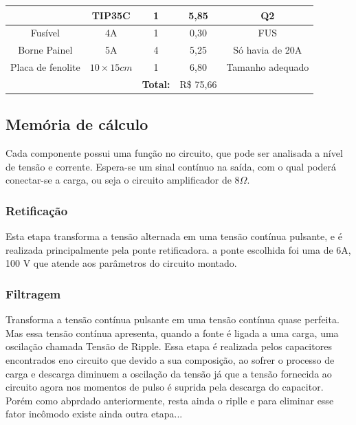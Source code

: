 \documentclass[a4paper,12pt,oneside,openany,table,xcdraw]{article}
\begin{document}
\begin{table}[H]
{\begin{tabular}{cc|c|c|c}
\multicolumn{1}{|c|}{}                              & TIP35C                 & 1                   & 5,85                         & \multicolumn{1}{c|}{Q2}                    \\ \hline
\multicolumn{1}{|c|}{Fusível}                       & 4A                     & 1                   & 0,30                         & \multicolumn{1}{c|}{FUS}                   \\ \hline
\multicolumn{1}{|c|}{Borne Painel}                  & 5A                     & 4                   & 	5,25	  & \multicolumn{1}{c|}{Só havia de 20A}       \\ \hline
\multicolumn{1}{|c|}{Placa de fenolite}             & $10\times 15cm$        & 1                   & 6,80                         & \multicolumn{1}{c|}{Tamanho adequado}      \\ \hline
                                                    &                        & \textbf{Total:}     & R\$ 75,66                    &                                            \\ \cline{3-4}
\end{tabular}%
}
\end{table}

\vspace{0.2cm}
\subsection{Memória de cálculo} %
Cada componente possui uma função no circuito, que pode ser analisada a nível de tensão e corrente. Espera-se um sinal contínuo na saída, com o qual poderá conectar-se a carga, ou seja o circuito amplificador de $8 \Omega$.

\subsubsection{Retificação}
Esta etapa transforma a tensão alternada em uma tensão contínua pulsante, e é realizada principalmente pela ponte retificadora. a ponte escolhida foi uma de 6A, 100 V que atende aos parâmetros do circuito montado.


\subsubsection{Filtragem}
Transforma a tensão contínua pulsante em uma tensão contínua quase perfeita. Mas essa tensão contínua apresenta, quando a fonte é ligada a uma carga, uma oscilação chamada Tensão de Ripple. Essa etapa é realizada pelos capacitores encontrados eno circuito que devido a sua composição, ao sofrer o processo de carga e descarga diminuem a oscilação da tensão já que a tensão fornecida ao circuito agora nos momentos de pulso é suprida pela descarga do capacitor. Porém como abprdado anteriormente, resta ainda o riplle e para eliminar esse fator incômodo existe ainda outra etapa...
\end{document}
